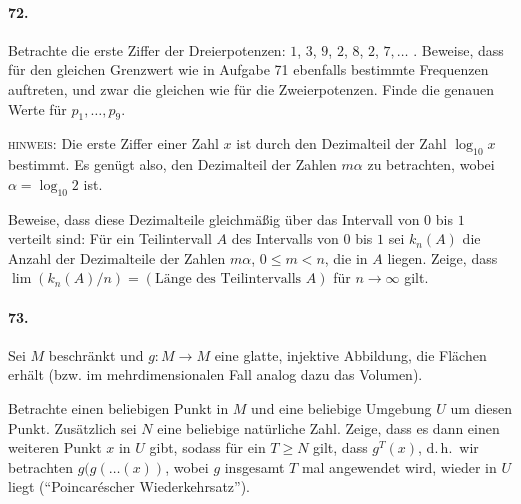 \documentclass[10pt,a5paper,twoside]{article}
\newenvironment{problem}[1]{\paragraph*{#1}}{}
\begin{document}
\begin{problem}{72.}
	Betrachte die erste Ziffer der Dreierpotenzen: $1$,
	$3$, $9$, $2$, $8$, $2$, $7, \dots$ . Beweise, dass für den gleichen Grenzwert wie in Aufgabe 71 ebenfalls bestimmte Frequenzen auftreten, und zwar die gleichen wie für die Zweierpotenzen. Finde die genauen Werte für $p_1, \dots, p_9$.

	\noindent\textsc{hinweis:} Die erste Ziffer einer Zahl $x$ ist durch den Dezimalteil der Zahl 
	$\log_{10} x$ bestimmt. Es genügt also, den Dezimalteil der Zahlen $m \alpha$ zu betrachten, wobei $\alpha=\log_{10} 2$ ist.

	Beweise, dass diese Dezimalteile gleichmäßig über das Intervall von $0$ bis $1$ verteilt sind: Für ein Teilintervall $A$ des Intervalls von $0$ bis $1$ sei $k_n(A)$ die Anzahl der Dezimalteile der Zahlen $m\alpha$, $0 \leqslant m < n$, die in $A$ liegen. Zeige, dass $\lim(k_n(A)/n)=(\text{Länge des Teilintervalls $A$})$ für $n\rightarrow \infty$ gilt.
\end{problem}

\begin{problem}{73.}
	Sei $M$ beschränkt und $g\colon M \to M$ eine glatte, injektive Abbildung, die Flächen erhält (bzw. im mehrdimensionalen Fall analog dazu das Volumen). 

	 
	Betrachte einen beliebigen Punkt in $M$ und eine beliebige Umgebung $U$ um diesen Punkt. Zusätzlich sei $N$ eine beliebige natürliche Zahl. 
	Zeige, dass es dann einen weiteren Punkt $x$ in $U$ gibt, sodass für ein $T\geq N$ gilt, dass $g^T (x)$, d.\,h.\ wir betrachten $g(g(\dots (x))$, wobei $g$ insgesamt $T$ mal angewendet wird, wieder in $U$ liegt (\enquote{Poincaréscher Wiederkehrsatz}).


\end{problem}
\end{document}
